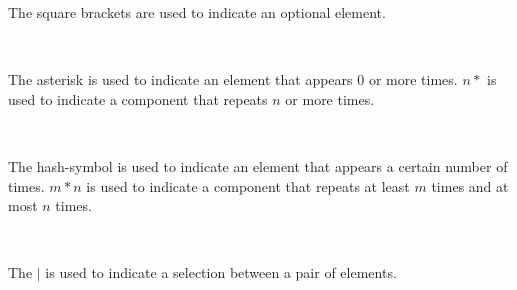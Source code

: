 The square brackets are used to indicate an optional element.
\begin{bnf*}
\\
\end{bnf*}

The asterisk is used to indicate an element that appears 0 or more times. $n*$ is used to indicate a component that repeats $n$ or more times.
\begin{bnf*}
\\
\end{bnf*}

The hash-symbol is used to indicate an element that appears a certain number of times. $m*n$ is used to indicate a component that repeats at least $m$ times and at most $n$ times.
\begin{bnf*}
\\
\end{bnf*}

The $|$ is used to indicate a selection between a pair of elements.
\begin{bnf*}
\\
\end{bnf*}

